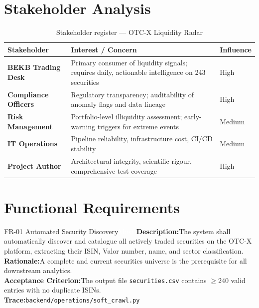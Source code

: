 \documentclass[
  11pt,
  a4paper,
  twoside,
  openany
]{report}
\begin{document}
\section{Stakeholder Analysis}

\begin{table}[H]
\centering
\caption{Stakeholder register — OTC-X Liquidity Radar}
\label{tab:stakeholders}
\begin{tabularx}{\textwidth}{>{\bfseries}l X l}
\toprule
\textbf{Stakeholder} & \textbf{Interest / Concern} & \textbf{Influence} \\
\midrule
BEKB Trading Desk   & Primary consumer of liquidity signals; requires daily, actionable intelligence on 243 securities & High \\
Compliance Officers  & Regulatory transparency; auditability of anomaly flags and data lineage & High \\
Risk Management      & Portfolio-level illiquidity assessment; early-warning triggers for extreme events & Medium \\
IT Operations        & Pipeline reliability, infrastructure cost, CI/CD stability & Medium \\
Project Author       & Architectural integrity, scientific rigour, comprehensive test coverage & High \\
\bottomrule
\end{tabularx}
\end{table}

\section{Functional Requirements}

\begin{requirement}{FR-01 \;\textbar\; Automated Security Discovery\hfill\textcolor{white}{Must}}
\textbf{Description:}\;The system shall automatically discover and catalogue all actively traded securities on the OTC-X platform, extracting their ISIN, Valor number, name, and sector classification.\\[4pt]
\textbf{Rationale:}\;A complete and current securities universe is the prerequisite for all downstream analytics.\\[4pt]
\textbf{Acceptance Criterion:}\;The output file \texttt{securities.csv} contains $\geq 240$ valid entries with no duplicate ISINs.\\[4pt]
\textbf{Trace:}\;\texttt{backend/operations/soft\_crawl.py}
\end{requirement}
\end{document}
